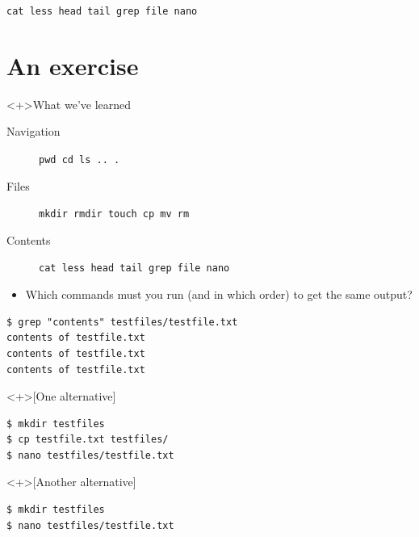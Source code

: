 \begin{frame}[fragile]
  \begin{exercise}
    \begin{center}
      \lstinline[basicstyle=\Large]{cat less head tail grep file nano}
    \end{center}
  \end{exercise}
\end{frame}


\section{An exercise}

\begin{frame}[fragile]
  \begin{block}<+>{What we've learned}
    \begin{description}
      \item[Navigation] \lstinline{pwd cd ls .. .}
      \item[Files] \lstinline{mkdir rmdir touch cp mv rm}
      \item[Contents] \lstinline{cat less head tail grep file nano}
    \end{description}
  \end{block}

  \begin{exercise}
    \begin{itemize}
      \item Which commands must you run (and in which order) to get the same 
        output?
    \end{itemize}
    \begin{lstlisting}[numbers=none]
$ grep "contents" testfiles/testfile.txt
contents of testfile.txt
contents of testfile.txt
contents of testfile.txt
    \end{lstlisting}
  \end{exercise}
\end{frame}

\begin{frame}[fragile]
  \begin{solution}<+>[One alternative]
    \begin{lstlisting}[numbers=none]
$ mkdir testfiles
$ cp testfile.txt testfiles/
$ nano testfiles/testfile.txt
    \end{lstlisting}
  \end{solution}
  \begin{solution}<+>[Another alternative]
    \begin{lstlisting}[numbers=none]
$ mkdir testfiles
$ nano testfiles/testfile.txt
    \end{lstlisting}
  \end{solution}
\end{frame}



